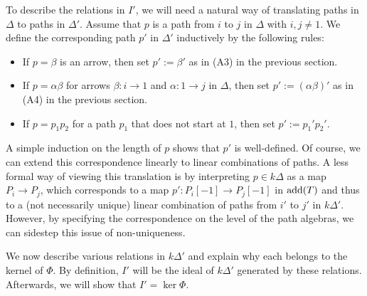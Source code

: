 \documentclass{amsart}
\begin{document}
To describe the relations in $I'$, we will need a natural way of translating paths in $\Delta$ to paths in $\Delta'$.  Assume that $p$ is a path from $i$ to $j$ in $\Delta$ with $i, j \neq 1$.  We define the corresponding path $p'$ in $\Delta'$ inductively by the following rules:
\begin{itemize}
\item If $p = \beta$ is an arrow, then set $p' := \beta'$ as in (A3) in the previous section.
\item If $p = \alpha \beta$ for arrows $\beta : i \rightarrow 1$ and $\alpha : 1 \rightarrow j$ in $\Delta$, then set $p' := (\alpha \beta)'$ as in (A4) in the previous section.
\item If $p = p_1 p_2$ for a path $p_1$ that does not start at $1$, then set $p' := p_1'p_2'$.
\end{itemize}
A simple induction on the length of $p$ shows that $p'$ is well-defined.  Of course, we can extend this correspondence linearly to linear combinations of paths.  A less formal way of viewing this translation is by interpreting $p \in k\Delta$ as a map $P_i \rightarrow P_j$, which corresponds to a map $p': P_i[-1] \rightarrow P_j[-1]$ in $\mathrm{add}(T)$ and thus to a (not necessarily unique) linear combination of paths from $i'$ to $j'$ in $k\Delta'$.  However, by specifying the correspondence on the level of the path algebras, we can sidestep this issue of non-uniqueness.


We now describe various relations in $k\Delta'$ and explain why each belongs to the kernel of $\Phi$.  By definition, $I'$ will be the ideal of $k\Delta'$ generated by these relations.  Afterwards, we will show that $I' = \ker \Phi$. \\
\end{document}
